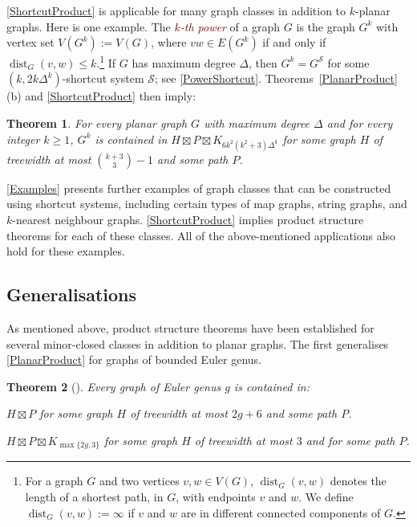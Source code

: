 \documentclass{patmorin}
\theoremstyle{plain}
\newtheorem{thm}{Theorem}
\theoremstyle{definition}
\newcommand{\defin}[1]{\textcolor{Maroon}{\emph{#1}}}
\DeclareMathOperator{\dist}{dist}
\renewcommand{\SS}{\mathcal{S}}
\renewcommand{\geq}{\geqslant}
\renewcommand{\leq}{\leqslant}
\begin{document}
\cref{ShortcutProduct} is applicable for many graph classes in addition to $k$-planar graphs. Here is one example. The \defin{$k$-th power} of a graph $G$ is the graph $G^k$ with vertex set $V(G^k):=V(G)$, where $vw\in E(G^k)$ if and only if $\dist_G(v,w)\leq k$.\footnote{For a graph $G$ and two vertices $v,w\in V(G)$, $\dist_G(v,w)$  denotes the length of a shortest path, in $G$, with endpoints $v$ and $w$.  We define $\dist_G(v,w):=\infty$ if $v$ and $w$ are in different connected components of $G$.} If $G$ has maximum degree $\Delta$, then $G^k = G^\SS$ for some $(k,2k\Delta^{k})$-shortcut system $\SS$; see \cref{PowerShortcut}. Theorems~\ref{PlanarProduct}(b) and \ref{ShortcutProduct} then imply:

\begin{thm}
\label{kPowerBasic}
For every planar graph $G$ with maximum degree $\Delta$ and for every integer $k\geq 1$, $G^k$ is contained in $H\boxtimes P\boxtimes K_{6k^2(k^2+3)\Delta^{k}}$ for some graph $H$ of treewidth at most $\binom{k+3}{3}-1$ and some path $P$.
\end{thm}

\cref{Examples} presents further examples of graph classes that can be constructed using shortcut systems, including certain types of map graphs, string graphs, and $k$-nearest neighbour graphs. \cref{ShortcutProduct} implies product structure theorems for each of these classes. All of the above-mentioned applications also hold for these examples.

\subsection{Generalisations}
\label{Generalisations}

As mentioned above, product structure theorems have been established for several minor-closed classes in addition to planar graphs. The first generalises \cref{PlanarProduct} for graphs of bounded Euler genus.

\begin{thm}[\citep{DJMMUW20,UWY,DHHW}]
\label{GenusProduct}
Every graph of Euler genus $g$ is contained in:
\begin{compactenum}[(a)]
\item $H  \boxtimes P$ for some graph $H$ of treewidth at most $2g+6$  and some path $P$.
\item $H \boxtimes P \boxtimes K_{\max\{2g,3\}}$ for some graph $H$ of treewidth at most $3$ and for some path $P$.
\end{compactenum}
\end{thm}
\end{document}
